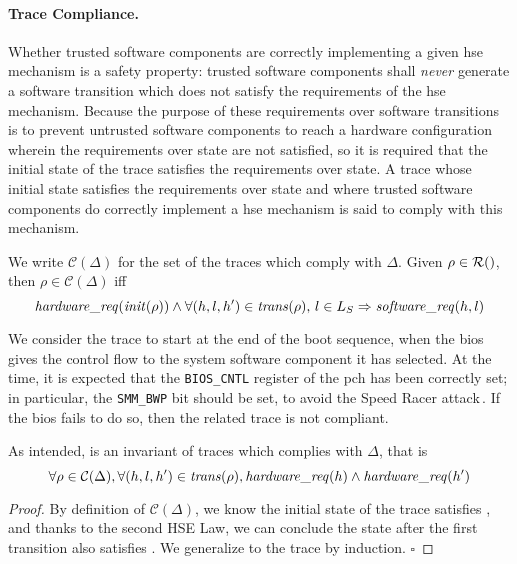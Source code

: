 \paragraph{Trace Compliance.}
%
Whether trusted software components are correctly implementing a given \ac{hse}
mechanism is a safety property: trusted software components shall \emph{never}
generate a software transition which does not satisfy the requirements of the
\ac{hse} mechanism.
%
Because the purpose of these requirements over software transitions is to
prevent untrusted software components to reach a hardware configuration wherein
the requirements over state are not satisfied, so it is required that the
initial state of the trace satisfies the requirements over state.
%
A trace whose initial state satisfies the requirements over state and where
trusted software components do correctly implement a \ac{hse} mechanism is said
to comply with this mechanism.
%
\begin{definition}
  We write $\mathcal{C}(\Delta)$ for the set of the traces which comply with
  $\Delta$.
  Given $\rho \in \pathesLTS{Ez}$, then $\rho \in \mathcal{C}(\Delta)$ iff
  \[
    \mathit{hardware\_req}(\mathit{init}(\rho)) \wedge \forall (h,l,h') \in
    \mathit{trans}(\rho)\text{, }l \in L_S \Rightarrow \mathit{software\_req}(h, l)
  \]
\end{definition}

\begin{example}
  We consider the trace to start at the end of the boot sequence, when the
  \ac{bios} gives the control flow to the system software component it has
  selected.
  At the time, it is expected that the \texttt{BIOS\_CNTL} register of the
  \ac{pch} has been correctly set; in particular, the \texttt{SMM\_BWP} bit
  should be set, to avoid the Speed Racer
  attack\,\cite{kallenberg2015racecondition}.
  If the \ac{bios} fails to do so, then the related trace is not compliant.
\end{example}

\begin{lemma}
  \label{lemma:speccert:hseinv}
  As intended,  is an invariant of traces which complies
  with $\Delta$, that is
  \[
    \forall \rho \in \mathcal{C}(\Delta), \forall (h, l, h') \in
    \mathit{trans}(\rho), \mathit{hardware\_req}(h) \wedge \mathit{hardware\_req}(h')
  \]

  \begin{proof}
    By definition of $\mathcal{C}(\Delta)$, we know the initial state of the
    trace satisfies , and thanks to the second HSE Law, we
    can conclude the state after the first transition also satisfies
    .
    We generalize to the trace by induction.
    \hfill \( \square \)
  \end{proof}
\end{lemma}

